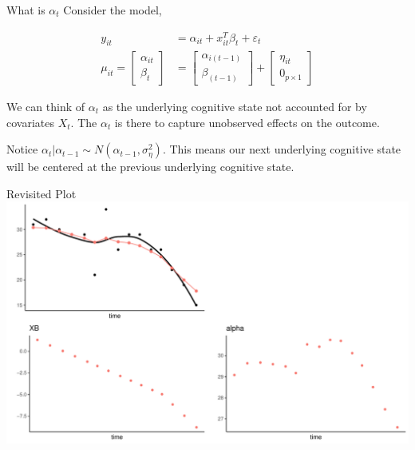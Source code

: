 \documentclass[
  ignorenonframetext,
]{beamer}
\begin{document}
\begin{frame}{What is \(\alpha_t\)}
\protect\hypertarget{what-is-alpha_t}{}
Consider the model,

\begin{align*}
y_{it} &= \alpha_{it} + x_{it}^T\beta_t
+ \varepsilon_t\\
\mu_{it} =
\begin{bmatrix}
\alpha_{it}\\
\beta_{t}
\end{bmatrix} &= 
\begin{bmatrix}
\alpha_{i(t-1)}\\
\beta_{(t-1)}
\end{bmatrix} + 
\begin{bmatrix}
\eta_{it} \\
0_{p \times 1}
\end{bmatrix}
\end{align*}

We can think of \(\alpha_t\) as the underlying cognitive state not
accounted for by covariates \(X_t\). The \(\alpha_t\) is there to
capture unobserved effects on the outcome.

Notice \(\alpha_t|\alpha_{t-1} \sim N(\alpha_{t-1}, \sigma^2_\eta)\).
This means our next underlying cognitive state will be centered at the
previous underlying cognitive state.
\end{frame}

\begin{frame}{Revisited Plot}
\protect\hypertarget{revisited-plot}{}
\includegraphics{Prez4_files/figure-beamer/unnamed-chunk-10-1.pdf}
\end{frame}
\end{document}
